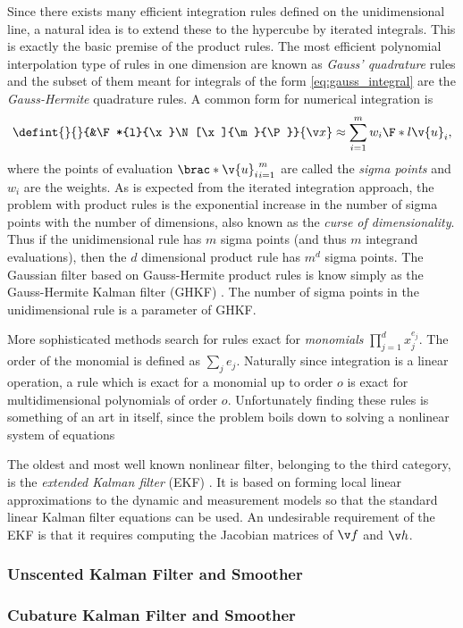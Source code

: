 Since there exists many efficient integration rules defined on the unidimensional line,
a natural idea is to extend these to the hypercube by iterated integrals. This is exactly the 
basic premise of the product rules. The most efficient polynomial interpolation type of rules
in one dimension are known as \emph{Gauss' quadrature} rules and the subset of them
meant for integrals of the form \eqref{eq:gauss_integral} are the \emph{Gauss-Hermite}
quadrature rules. A common form for numerical integration is
\begin{align}
	\defint{}{}{&\F*{l}{\x}\N[\x]{\m}{\P}}{\x} \approx \sum_{i=1}^m w_i\F*{l}{\v{u}_i}, 
\end{align}
where the points of evaluation $\brac*{\v{u}_i}_{i=1}^m$ are called the \emph{sigma points}
and $w_i$ are the weights. As is expected from the iterated integration approach,
the problem with product rules is the exponential increase in the number of sigma points with
the number of dimensions, also known as the \emph{curse of dimensionality}. Thus if the unidimensional rule has $m$ sigma points (and thus $m$ integrand evaluations),
then the $d$ dimensional product rule has $m^d$ sigma points. The Gaussian filter based
on Gauss-Hermite product rules is know simply as the Gauss-Hermite Kalman filter (GHKF) \parencite{Ito2000}.
The number of sigma points in the unidimensional rule is a parameter of GHKF.

More sophisticated methods search for rules
exact for \emph{monomials} $\prod_{j=1}^d x_j^{e_j}$. The order of the monomial
is defined as $\sum_j e_j$. Naturally since integration is a linear operation, a rule which is exact 
for a monomial up to order $o$ is exact for multidimensional polynomials of order $o$.
Unfortunately finding these rules is something of an art in itself, since the problem
boils down to solving a nonlinear system of equations 





The oldest and most well known nonlinear filter, belonging to the third category, is
the \emph{extended Kalman filter} (EKF) \parencite{jazwinski2007stochastic}. 
It is based on forming local linear approximations to the dynamic
and measurement models so that the standard linear Kalman filter equations can be used.
An undesirable requirement of the EKF is that it requires computing
the Jacobian matrices of $\f$ and $\h$.

\parencite{Arasaratnam2009,Ito2000}
\subsubsection{Unscented Kalman Filter and Smoother}
\parencite{julier1997new,Merwe2004}
\subsubsection{Cubature Kalman Filter and Smoother}
\parencite{Arasaratnam2009,Arasaratnam2011,Jia2012}



